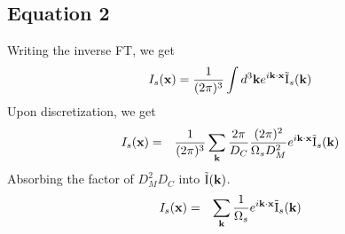\documentclass[12pt]{article}
\def\il{{\tilde{\rm I}}}
\numberwithin{equation}{section}
\begin{document}
\subsection{Equation 2}
Writing the inverse FT, we get
\begin{eqnarray}
	I_s(\textbf{x}) = \frac{1}{(2\pi)^3}  \int d^3 \textbf{k} e^{i \textbf{k} \cdot \textbf{x}} \il_s(\textbf{k})
\end{eqnarray}
Upon discretization, we get
\begin{eqnarray}
	I_s(\textbf{x}) &=& \frac{1}{(2 \pi)^3} \sum_{\textbf{k}} \frac{2\pi}{D_C} \frac{(2\pi)^2}{\Omega_s D_M^2} e^{i \textbf{k} \cdot \textbf{x}} \il_s(\textbf{k}) 
\end{eqnarray}
Absorbing the factor of $ D_M^2 D_C $ into $ \il(\textbf{k}) $.
\begin{eqnarray}
	I_s(\textbf{x}) & = & \sum_\textbf{k} \frac{1}{\Omega_s} e^{i \textbf{k} \cdot \textbf{x}} \il_s(\textbf{k})
\end{eqnarray}
\end{document}
